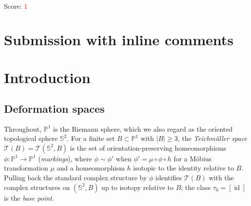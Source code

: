 \documentclass[11pt]{article}
\newcommand{\Pone}{\mathbb P^1}
\newcommand{\Sph}{\mathbb S^2}
\newcommand{\Z}{\mathbb Z}
\newcommand{\Teich}{\mathcal T}
\newcommand{\D}{\mathcal D}
\newcommand{\id}{\operatorname{id}}
\theoremstyle{remark}
\numberwithin{equation}{section}
\begin{document}
\noindent Score:
\textcolor{red}{1}
\newpage
\section{Submission with inline comments}


\begin{abstract}
Let $f$ be a quadratic rational map one of whose critical points lies in a
cycle $A$ of length four and whose other critical value $v$ lies outside
$A$, and let $B=A\cup\{v\}$. Epstein's deformation space $\D_f\subset\Teich(\Sph,B)$ is
known to be disconnected (Hironaka--Koch). We write down an explicit simple
closed curve $\gamma$ on $(\Sph,B)$, for a normalized model map the image
of a round circle under two Dehn twists about a second round circle,
transported to a general $f$ along a path in parameter space, and prove
that the Dehn twist $T_\gamma$ itself preserves $\D_f$ and that the
translates $T_\gamma^n(D_0)$, $n\in\Z$, of the base component $D_0$ are
pairwise distinct components, using the covering-space framework of
Hironaka--Koch and a winding-number obstruction.
\end{abstract}

\section{Introduction}

\subsection{Deformation spaces}\label{sec:defspaces}

Throughout, $\Pone$ is the Riemann sphere, which we also regard as the
oriented topological sphere $\Sph$. For a finite set $B\subset\Pone$ with
$|B|\ge3$, the \emph{Teichm\"uller space} $\Teich(B)=\Teich(\Sph,B)$ is the
set of orientation-preserving homeomorphisms $\phi\colon\Pone\to\Pone$
(\emph{markings}), where $\phi\sim\phi'$ when $\phi'=\mu\circ\phi\circ h$
for a M\"obius transformation $\mu$ and a homeomorphism $h$ isotopic to the
identity relative to $B$. Pulling back the standard complex structure by
$\phi$ identifies $\Teich(B)$ with the complex structures on $(\Sph,B)$ up
to isotopy relative to $B$; the class $\tau_0=[\id]$ is the \emph{base
point}.
\end{document}
